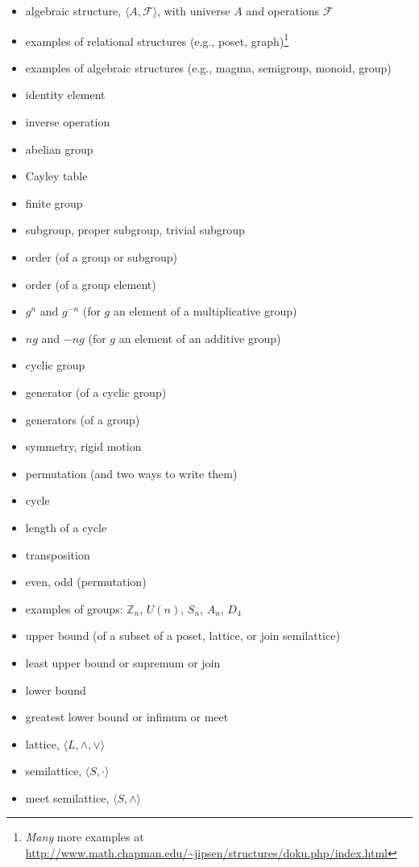 \documentclass[12pt]{article}
\newcommand{\boldemph}[1]{#1}
\newcommand\<{\ensuremath{\langle}}
\renewcommand\>{\ensuremath{\rangle}}
\newcommand\meet{\ensuremath{\wedge}}
\newcommand\join{\ensuremath{\vee}}
\begin{document}
\begin{itemize}
\item algebraic structure, $\<A, \mathcal{F}\>$, with universe $A$ and operations $\mathcal{F}$ 
\item examples of relational structures (e.g., poset, graph)\footnote{\label{note1}\emph{Many} more examples at \url{http://www.math.chapman.edu/~jipsen/structures/doku.php/index.html}}
\item examples of algebraic structures (e.g., magma, semigroup, monoid, group)\footnotemark[\ref{note1}]
\item identity element
\item inverse operation
\item abelian group
\item Cayley table
\item finite group
\item subgroup, proper subgroup, trivial subgroup
\item order (of a group or subgroup)
\item order (of a group element)
\item $g^n$ and $g^{-n}$ (for $g$ an element of a multiplicative group)
\item $ng$ and $-ng$ (for $g$ an element of an additive group)
\item cyclic group
\item generator (of a cyclic group)
\item generators (of a group)
\item symmetry, rigid motion
\item permutation (and two ways to write them)
\item cycle
\item length of a cycle
\item transposition
\item even, odd (permutation)
\item examples of groups: $\mathbb{Z}_n$, $U(n)$, $S_n$, $A_n$, $D_4$
\item \boldemph{upper bound} (of a subset of a poset, lattice, or join semilattice)
\item \boldemph{least upper bound} or \boldemph{supremum} or join
\item \boldemph{lower bound}
\item \boldemph{greatest lower bound} or \boldemph{infimum} or meet
\item \boldemph{lattice}, $\<L, \meet, \join\>$
\item \boldemph{semilattice}, $\<S, \cdot\>$
\item \boldemph{meet semilattice}, $\<S, \meet\>$

\end{itemize}
\end{document}

